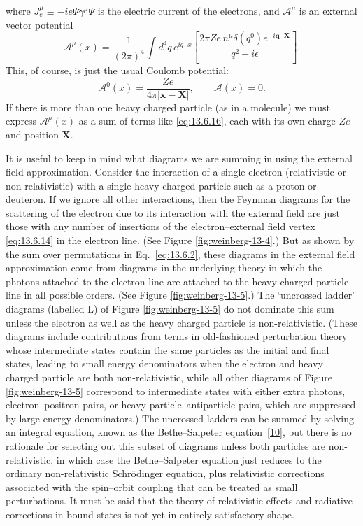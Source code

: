 where $J_e^\mu\equiv-ie\bar\Psi\gamma^\mu\Psi$ is the electric current of the electrons, and $\mathcal A^\mu$ is an
external vector potential
\begin{equation}
\mathcal A^\mu(x)=\frac{1}{(2\pi)^4}\int d^4q\,e^{iq\cdot x}
\left[\frac{2\pi Ze\,n^\mu\delta(q^0)e^{-i\mathbf q\cdot\mathbf X}}
{q^2-i\epsilon}\right].
\tag{13.6.15}\label{eq:13.6.15}
\end{equation}
This, of course, is just the usual Coulomb potential:
\begin{equation}
\mathcal A^0(x)=\frac{Ze}{4\pi|\mathbf x-\mathbf X|},
\qquad \boldsymbol{\mathcal A}(x)=0.
\tag{13.6.16}\label{eq:13.6.16}
\end{equation}
If there is more than one heavy charged particle (as in a molecule) we
must express $\mathcal A^\mu(x)$ as a sum of terms like \eqref{eq:13.6.16}, each with its own
charge $Ze$ and position $\mathbf X$.

It is useful to keep in mind what diagrams we are summing in using the
external field approximation. Consider the interaction of a single electron
(relativistic or non-relativistic) with a single heavy charged particle such
as a proton or deuteron. If we ignore all other interactions, then the
Feynman diagrams for the scattering of the electron due to its interaction
with the external field are just those with any number of insertions of
the electron--external field vertex \eqref{eq:13.6.14} in the electron line. (See Figure
\ref{fig:weinberg-13-4}.) But as shown by the sum over permutations in Eq.~\eqref{eq:13.6.2}, these
diagrams in the external field approximation come from diagrams in the
underlying theory in which the photons attached to the electron line are
attached to the heavy charged particle line in all possible orders. (See
Figure \ref{fig:weinberg-13-5}.) The `uncrossed ladder' diagrams (labelled L) of Figure
\ref{fig:weinberg-13-5} do not dominate this sum unless the electron as well as the heavy
charged particle is non-relativistic. (These diagrams include contributions
from terms in old-fashioned perturbation theory whose intermediate states
contain the same particles as the initial and final states, leading to small
energy denominators when the electron and heavy charged particle are
both non-relativistic, while all other diagrams of Figure \ref{fig:weinberg-13-5} correspond
to intermediate states with either extra photons, electron--positron pairs,
or heavy particle--antiparticle pairs, which are suppressed by large energy
denominators.) The uncrossed ladders can be summed by solving an
integral equation, known as the Bethe--Salpeter equation~\hyperref[ref:13.10]{[10]}, but there is no
rationale for selecting out this subset of diagrams unless both particles are
non-relativistic, in which case the Bethe--Salpeter equation just reduces
to the ordinary non-relativistic Schr\"odinger equation, plus relativistic
corrections associated with the spin--orbit coupling that can be treated as
small perturbations. It must be said that the theory of relativistic effects
and radiative corrections in bound states is not yet in entirely satisfactory
shape.

